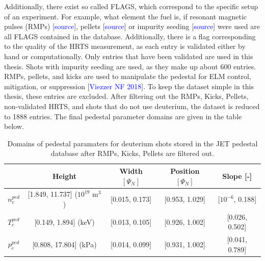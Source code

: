 \documentclass[a4paper, twoside, final, 12pt]{article}
\begin{document}
Additionally, there exist so called FLAGS, which correspond to the specific setup of an experiment.
For example, what element the fuel is, if resonant magnetic pulses (RMPs) [\textcolor{blue}{source}], pellets [\textcolor{blue}{source}] or impurity seeding [\textcolor{blue}{source}] were used are all FLAGS contained in the database.
Additionally, there is a flag corresponding to the quality of the HRTS measurement, as each entry is validated either by hand or computationally.
Only entries that have been validated are used in this thesis.
Shots with impurity seeding are used, as they make up about 600 entries.
RMPs, pellets, and kicks are used to manipulate the pedestal for ELM control, mitigation, or suppression [\textcolor{blue}{Viezzer NF 2018}].
To keep the dataset simple in this thesis, these entries are excluded.
After filtering out the RMPs, Kicks, Pellets, non-validated HRTS, and shots that do not use deuterium, the dataset is reduced to 1888 entries. The final pedestal parameter domains are given in the table below.
\begin{center}
\begin{table}
\begin{tabular}{ | c | c | c | c | c | }	
	\hline 
	& Height & Width $[\Psi_N]$ & Position $[\Psi_N]$ & Slope [-] \\ 
	\hline
	$n_e^{ped}$ &[1.849, 11.737] ($10^{19}$ m$^3$) & [0.015, 0.173]& [0.953, 1.029] & [$10^{-6}$, 0.188] \\
	$T_e^{ped}$ & [0.149, 1.894] (keV)& [0.013, 0.105] & [0.926, 1.002] & [0.026, 0.502] \\
	$p_e^{ped}$ & [0.808, 17.804] (kPa)& [0.014, 0.099] & [0.931, 1.002]& [0.041, 0.789] \\
	\hline

	
\end{tabular}
\label{tab:ped_quant}
\caption{Domains of pedestal paramaters for deuterium shots stored in the JET pedestal database after RMPs, Kicks, Pellets are filtered out.}
\end{table}
\end{center}
\end{document}
